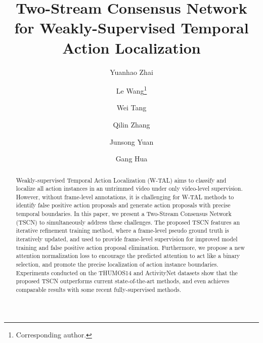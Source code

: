 \documentclass[runningheads]{llncs}
\begin{document}
\pagestyle{headings}
\mainmatter
\def\ECCVSubNumber{4602}  

\title{Two-Stream Consensus Network for Weakly-Supervised Temporal Action Localization}

\begin{comment}
\titlerunning{ECCV-20 submission ID \ECCVSubNumber} 
\authorrunning{ECCV-20 submission ID \ECCVSubNumber} 
\author{Anonymous ECCV submission}
\institute{Paper ID \ECCVSubNumber}
\end{comment}


\author{Yuanhao Zhai \and
Le Wang\thanks{Corresponding author.} \and
Wei Tang \and
Qilin Zhang \and
Junsong Yuan \and
Gang Hua
}
\maketitle

\begin{abstract}
Weakly-supervised Temporal Action Localization (W-TAL) aims to classify and localize all action instances in an untrimmed video under only video-level supervision. 
However, without frame-level annotations, it is challenging for W-TAL methods to identify false positive action proposals and generate action proposals with precise temporal boundaries.
In this paper, we present a Two-Stream Consensus Network (TSCN) to simultaneously address these challenges. 
The proposed TSCN features an iterative refinement training method, where a frame-level pseudo ground truth is iteratively updated, and used to provide frame-level supervision for improved model training and false positive action proposal elimination.
Furthermore, we propose a new attention normalization loss to encourage the predicted attention to act like a binary selection, and promote the precise localization of action instance boundaries.
Experiments conducted on the THUMOS14 and ActivityNet datasets show that the proposed TSCN outperforms current state-of-the-art methods, and even achieves comparable results with some recent fully-supervised methods.
\end{abstract}
\end{document}
